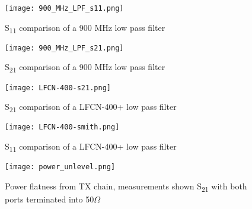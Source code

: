 \begin{figure}[H]
	\centering
	\texttt{[image: 900\_MHz\_LPF\_s11.png]}
	\caption{S\textsubscript{11} comparison of a 900 MHz low pass filter}
	\label{fig:compare_900_s11}
\end{figure}

\begin{figure}[H]
	\centering
	\texttt{[image: 900\_MHz\_LPF\_s21.png]}
	\caption{S\textsubscript{21} comparison of a 900 MHz low pass filter}
	\label{fig:compare_900_s21}
\end{figure}


\begin{figure}[H]
	\centering
	\texttt{[image: LFCN-400-s21.png]}
	\caption{S\textsubscript{21} comparison of a LFCN-400+ low pass filter}
	\label{fig:compare_lfcn_s21}
\end{figure}

\begin{figure}[H]
	\centering
	\texttt{[image: LFCN-400-smith.png]}
	\caption{S\textsubscript{11} comparison of a LFCN-400+ low pass filter}
	\label{fig:compare_lfcn_smith}
\end{figure}

\begin{figure}[H]
	\centering
	\texttt{[image: power\_unlevel.png]}
	\caption{Power flatness from TX chain, measurements shown S\textsubscript{21} with both ports terminated into 50$\Omega$}
	\label{fig:power_unlevel}
\end{figure}